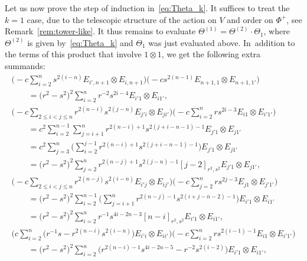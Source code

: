 \documentclass[pdftex]{sigma}
\numberwithin{equation}{section}
\begin{document}
Let
us now prove the step of induction in~\eqref{eq:Theta_k}. It suffices to treat the $k=1$ case, due to the telescopic structure of the action on $V$ and order on $\Phi^+$, see Remark~\ref{rem:tower-like}. It thus remains to evaluate $\Theta^{(1)}=\Theta^{(2)}\cdot \Theta_1$, where $\Theta^{(2)}$ is given by~\eqref{eq:Theta_k} and $\Theta_1$ was just evaluated above. In~addition to the terms of this product that involve $1 \otimes 1$, we get the following extra summands:
\begin{gather}
 \Biggl(-c\sum_{i = 2}^{n} s^{2(i -n)}E_{i',n + 1} \otimes E_{i,n + 1}\Biggr) \bigl(-cs^{2(n - 1)}E_{n + 1,1} \otimes E_{n + 1,1'} \bigr) \nonumber\\
 \qquad{}= \bigl(r^{2} - s^{2}\bigr)^{2}\sum_{i = 2}^{n}r^{-2}s^{2i - 4}E_{i'1} \otimes E_{i1'},\label{eq:term_a}
\\
 \Biggl(-c\sum_{2 \le i < j \le n}r^{2(n - i)}s^{2(j - n)}E_{j'i} \otimes E_{ji'}\Biggr) \Biggl(-c\sum_{i = 2}^{n}rs^{2i - 3}E_{i1} \otimes E_{i'1'}\Biggr) \nonumber\\
 \qquad{}=
 c^{2}\sum_{i = 2}^{n-1}\sum_{j = i + 1}^{n} r^{2(n - i) + 1}s^{2(j + i - n -1) - 1}E_{j'1} \otimes E_{j1'} \nonumber\\
 \qquad{}=
 c^{2}\sum_{j = 3}^{n}\Biggl( \sum_{i = 2}^{j - 1}r^{2(n - i) + 1}s^{2(j + i - n -1) - 1}\Biggr)E_{j'1} \otimes E_{j1'} \nonumber\\
 \qquad{}=
 \bigl(r^{2} - s^{2}\bigr)^{2}\sum_{j = 2}^{n}r^{2(n - j) + 1}s^{2(j - n) - 1}[j - 2]_{r^{2},s^{2}}E_{j'1} \otimes E_{j1'},\label{eq:term_b}
\\
 \Biggl(-c\sum_{2 \le i < j \le n}r^{2(n - j)}s^{2(i - n)}E_{i'j} \otimes E_{ij'}\Biggr)\Biggl(-c\sum_{j = 2}^{n}rs^{2j - 3}E_{j1} \otimes E_{j'1'}\Biggr) \nonumber\\
 \qquad{}=
 \bigl(r^{2} - s^{2}\bigr)^{2}\sum_{i = 2}^{n-1}\Biggl( \sum_{j = i + 1}^{n}r^{2(n - j)-1}s^{2(i + j - n - 2) - 1}\Biggr) E_{i'1} \otimes E_{i1'} \nonumber\\
 \qquad{}=
 \bigl(r^{2} -s^{2}\bigr)^{2}\sum_{i = 2}^{n}r^{-1}s^{4i - 2n - 3}[n - i]_{r^{2},s^{2}}E_{i'1} \otimes E_{i1'},\label{eq:term_c}
\\
 \Biggl(c\sum_{i = 2}^{n}\bigl(r^{-1}s - r^{2(n - i)}s^{2(i - n)}\bigr)E_{i'i} \otimes E_{ii'} \Biggr)\Biggl(-c\sum_{i = 2}^{n}rs^{2(i - 1) -1}E_{i1} \otimes E_{i'1'}\Biggr) \nonumber\\
 \qquad{}=
 \bigl(r^{2} - s^{2}\bigr)^{2}\sum_{i = 2}^{n}\bigl(r^{2(n - i) -1}s^{4i - 2n -5} -r^{-2}s^{2(i - 2)}\bigr)E_{i'1} \otimes E_{i1'},\label{eq:term_d}

\end{gather}
\end{document}
